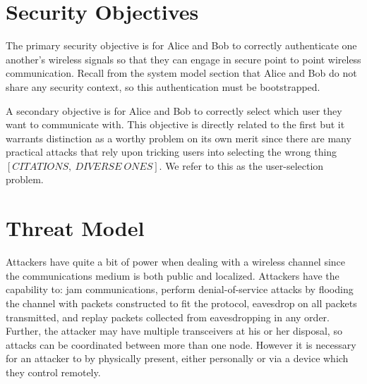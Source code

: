 \documentclass[12pt]{report}
\begin{document}
\section{Security Objectives}
The primary security objective is for Alice and Bob to correctly authenticate one another's wireless signals so that they can engage in secure point to point wireless communication. Recall from the system model section that Alice and Bob do not share any security context, so this authentication must be bootstrapped. \par

A secondary objective is for Alice and Bob to correctly select which user they want to communicate with. This objective is directly related to the first but it warrants distinction as a worthy problem on its own merit since there are many practical attacks that rely upon tricking users into selecting the wrong thing $[CITATIONS, \: DIVERSE \: ONES]$. We refer to this as the user-selection problem. \par

\section{Threat Model}
Attackers have quite a bit of power when dealing with a wireless channel since the communications medium is both public and localized. Attackers have the capability to: jam communications, perform denial-of-service attacks by flooding the channel with packets constructed to fit the protocol, eavesdrop on all packets transmitted, and replay packets collected from eavesdropping in any order. Further, the attacker may have multiple transceivers at his or her disposal, so attacks can be coordinated between more than one node. However it is necessary for an attacker to by physically present, either personally or via a device which they control remotely. \par
\end{document}
